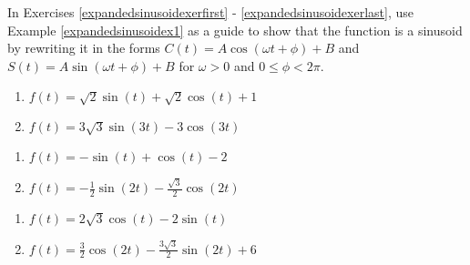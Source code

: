 \documentclass{ximera}
\begin{document}
\pagebreak

In Exercises \ref{expandedsinusoidexerfirst} - \ref{expandedsinusoidexerlast}, use Example \ref{expandedsinusoidex1} as a guide to show that the function is a sinusoid by rewriting it in the forms $C(t) = A \cos(\omega t + \phi) + B$ and $S(t) = A \sin(\omega t + \phi) + B$ for $\omega > 0$ and $0 \leq \phi < 2\pi$.

\begin{multicols}{2}

\begin{enumerate}

\setcounter{enumi}{\value{HW}}

\item $f(t) = \sqrt{2}\sin(t) + \sqrt{2}\cos(t) + 1$ \label{expandedsinusoidexerfirst}
\item $f(t) = 3\sqrt{3}\sin(3t) - 3\cos(3t)$

\setcounter{HW}{\value{enumi}}

\end{enumerate}

\end{multicols}

\begin{multicols}{2}

\begin{enumerate}

\setcounter{enumi}{\value{HW}}

\item $f(t) = -\sin(t) + \cos(t) - 2$  
\item $f(t) = -\frac{1}{2}\sin(2t) - \frac{\sqrt{3}}{2}\cos(2t)$

\setcounter{HW}{\value{enumi}}

\end{enumerate}

\end{multicols}

\begin{multicols}{2}

\begin{enumerate}

\setcounter{enumi}{\value{HW}}

\item  $f(t) = 2\sqrt{3} \cos(t) - 2\sin(t)$  
\item  $f(t) = \frac{3}{2} \cos(2t) - \frac{3\sqrt{3}}{2} \sin(2t) + 6$

\setcounter{HW}{\value{enumi}}

\end{enumerate}

\end{multicols}
\end{document}
